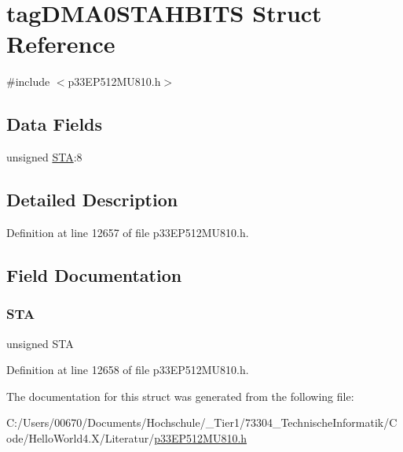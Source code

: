 \hypertarget{structtag_d_m_a0_s_t_a_h_b_i_t_s}{}\section{tag\+D\+M\+A0\+S\+T\+A\+H\+B\+I\+TS Struct Reference}
\label{structtag_d_m_a0_s_t_a_h_b_i_t_s}


{\ttfamily \#include $<$p33\+E\+P512\+M\+U810.\+h$>$}

\subsection*{Data Fields}
\begin{DoxyCompactItemize}
\item 
unsigned \hyperlink{structtag_d_m_a0_s_t_a_h_b_i_t_s_a0eec78ddd2c12af678d5fab70fe62d14}{S\+TA}\+:8
\end{DoxyCompactItemize}


\subsection{Detailed Description}


Definition at line 12657 of file p33\+E\+P512\+M\+U810.\+h.



\subsection{Field Documentation}
\mbox{\label{structtag_d_m_a0_s_t_a_h_b_i_t_s_a0eec78ddd2c12af678d5fab70fe62d14}} 
\subsubsection{\texorpdfstring{S\+TA}{STA}}
{\footnotesize\ttfamily unsigned S\+TA}



Definition at line 12658 of file p33\+E\+P512\+M\+U810.\+h.



The documentation for this struct was generated from the following file\+:\begin{DoxyCompactItemize}
\item 
C\+:/\+Users/00670/\+Documents/\+Hochschule/\+\_\+\+Tier1/73304\+\_\+\+Technische\+Informatik/\+Code/\+Hello\+World4.\+X/\+Literatur/\hyperlink{p33_e_p512_m_u810_8h}{p33\+E\+P512\+M\+U810.\+h}\end{DoxyCompactItemize}
